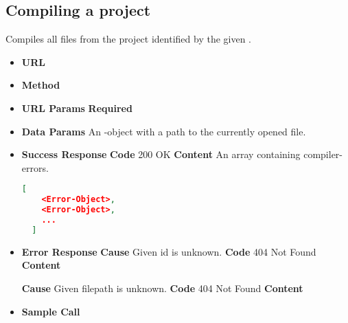 \subsection{Compiling a project}
Compiles all files from the project identified by the given .

\begin{itemize}
\item \textbf{URL} 
\item \textbf{Method} 

\item \textbf{URL Params}
  \newline\textbf{Required} 

\item \textbf{Data Params} An -object with a path to the currently opened file.
  

\item \textbf{Success Response}
  \newline\textbf{Code} 200 OK
  \newline\textbf{Content} An array containing compiler-errors.
  \begin{lstlisting}[basicstyle=\small,language=json]
  [
    <Error-Object>,
    <Error-Object>,
    ...
  ]
  \end{lstlisting}
  
\item \textbf{Error Response}
  \newline\textbf{Cause} Given id is unknown.
  \newline\textbf{Code} 404 Not Found
  \newline\textbf{Content} 

  \textbf{Cause} Given filepath is unknown.
  \newline\textbf{Code} 404 Not Found
  \newline\textbf{Content} 

\item \textbf{Sample Call}
\end{itemize}
